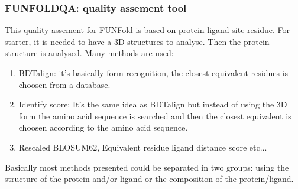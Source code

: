 \subsubsection{FUNFOLDQA: quality assement tool}
This quality assement for FUNFold is based on protein-ligand site residue. For starter, it is needed to have a 3D structures to analyse. Then the protein structure is analysed. Many methods are used:
\begin{enumerate}
\item{BDTalign: it's basically form recognition, the closest equivalent residues is choosen from a database.}
\item{Identify score: It's the same idea as BDTalign but instead of using the 3D form the amino acid sequence is searched and then the closest equivalent is choosen according to the amino acid sequence.}
\item{Rescaled BLOSUM62, Equivalent residue ligand distance score etc...}
\end{enumerate}

Basically most methods presented could be separated in two groups: using the structure of the protein and/or ligand or the composition of the protein/ligand.